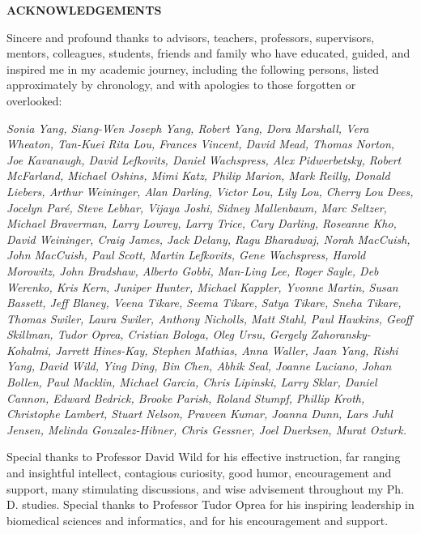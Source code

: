 \begin{centering}
\textbf{ACKNOWLEDGEMENTS}\\
\vspace{\baselineskip}
\end{centering}

Sincere and profound thanks to advisors, teachers, professors, supervisors, mentors, colleagues, students, friends and family who have educated, guided, and inspired me in my academic journey, including the following persons, listed approximately by chronology, and with apologies to those forgotten or overlooked:

\begin{singlespace}
\textit{Sonia Yang, Siang-Wen Joseph Yang, Robert Yang, Dora Marshall, Vera Wheaton, Tan-Kuei Rita Lou, Frances Vincent, David Mead, Thomas Norton, Joe Kavanaugh, David Lefkovits, Daniel Wachspress, Alex Pidwerbetsky, Robert McFarland, Michael Oshins, Mimi Katz, Philip Marion, Mark Reilly, Donald Liebers, Arthur Weininger, Alan Darling, Victor Lou, Lily Lou, Cherry Lou Dees, Jocelyn Par\'e, Steve Lebhar, Vijaya Joshi, Sidney Mallenbaum, Marc Seltzer, Michael Braverman, Larry Lowrey, Larry Trice, Cary Darling, Roseanne Kho, David Weininger, Craig James, Jack Delany, Ragu Bharadwaj, Norah MacCuish, John MacCuish, Paul Scott, Martin Lefkovits, Gene Wachspress, Harold Morowitz, John Bradshaw, Alberto Gobbi, Man-Ling Lee, Roger Sayle, Deb Werenko, Kris Kern, Juniper Hunter, Michael Kappler, Yvonne Martin, Susan Bassett, Jeff Blaney, Veena Tikare, Seema Tikare, Satya Tikare, Sneha Tikare, Thomas Swiler, Laura Swiler, Anthony Nicholls, Matt Stahl, Paul Hawkins, Geoff Skillman, Tudor Oprea, Cristian Bologa, Oleg Ursu, Gergely Zahoransky-Kohalmi, Jarrett Hines-Kay, Stephen Mathias, Anna Waller, Jaan Yang, Rishi Yang, David Wild, Ying Ding, Bin Chen, Abhik Seal, Joanne Luciano, Johan Bollen, Paul Macklin, Michael Garcia, Chris Lipinski, Larry Sklar, Daniel Cannon, Edward Bedrick, Brooke Parish, Roland Stumpf, Phillip Kroth, Christophe Lambert, Stuart Nelson, Praveen Kumar, Joanna Dunn, Lars Juhl Jensen, Melinda Gonzalez-Hibner, Chris Gessner, Joel Duerksen, Murat Ozturk.}
\end{singlespace}

Special thanks to Professor David Wild for his effective instruction, far ranging and insightful intellect, contagious curiosity, good humor, encouragement and support, many stimulating discussions, and wise advisement throughout my Ph. D. studies. Special thanks to Professor Tudor Oprea for his inspiring leadership in biomedical sciences and informatics, and for his encouragement and support. 
